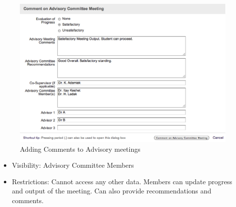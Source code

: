 \documentclass{journal}
\begin{document}
\begin{itemize}
\begin{figure}[htp]
\centering
\includegraphics[scale=1]{diagrams/HTMLTemplating/CommentAdvisory.png}
\caption{Adding Comments to Advisory meetings}
\label{fig:UpdateCAM}
\end{figure}

\begin{itemize}
\item Visibility: Advisory Committee Members
\item Restrictions: Cannot access any other data. Members can update progress and output of the meeting. Can also provide recommendations and comments.
\end{itemize}
\end{itemize}
\end{document}
